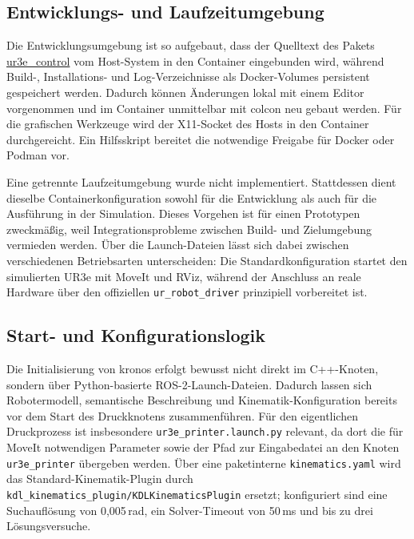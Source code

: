         \subsection{Entwicklungs- und Laufzeitumgebung}
            Die Entwicklungsumgebung ist so aufgebaut,
            dass der Quelltext des Pakets \url{ur3e\_control} vom Host-System in den Container eingebunden wird,
            während Build-, Installations- und Log-Verzeichnisse als Docker-Volumes persistent gespeichert werden.
            Dadurch können Änderungen lokal mit einem Editor vorgenommen und im Container unmittelbar mit colcon neu gebaut werden.
            Für die grafischen Werkzeuge wird der X11-Socket des Hosts in den Container durchgereicht.
            Ein Hilfsskript bereitet die notwendige Freigabe für Docker oder Podman vor.

            Eine getrennte Laufzeitumgebung wurde nicht implementiert.
            Stattdessen dient dieselbe Containerkonfiguration sowohl für die Entwicklung als auch für die Ausführung in der Simulation.
            Dieses Vorgehen ist für einen Prototypen zweckmäßig,
            weil Integrationsprobleme zwischen Build- und Zielumgebung vermieden werden.
            Über die Launch-Dateien lässt sich dabei zwischen verschiedenen Betriebsarten unterscheiden:
            Die Standardkonfiguration startet den simulierten UR3e mit MoveIt und RViz,
            während der Anschluss an reale Hardware über den offiziellen \texttt{ur\_robot\_driver} prinzipiell vorbereitet ist.

        \subsection{Start- und Konfigurationslogik}
            Die Initialisierung von \ac{kronos} erfolgt bewusst nicht direkt im C++-Knoten,
            sondern über Python-basierte ROS-2-Launch-Dateien.
            Dadurch lassen sich Robotermodell,
            semantische Beschreibung und Kinematik-Konfiguration bereits vor dem Start des Druckknotens zusammenführen.
            Für den eigentlichen Druckprozess ist insbesondere \texttt{ur3e\_printer.launch.py} relevant,
            da dort die für MoveIt notwendigen Parameter sowie der Pfad zur Eingabedatei an den Knoten \texttt{ur3e\_printer} übergeben werden.
            Über eine paketinterne \texttt{kinematics.yaml} wird das Standard-Kinematik-Plugin durch
            \texttt{kdl\_kinematics\_plugin/KDLKinematicsPlugin} ersetzt;
            konfiguriert sind eine Suchauflösung von 0{,}005\,rad, ein Solver-Timeout von 50\,ms und bis zu drei Lösungsversuche.

